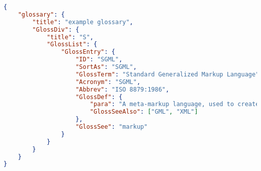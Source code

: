 \begin{frame}[containsverbatim]
	\begin{lstlisting}[language=json,firstnumber=1,basicstyle=\tiny]
{
    "glossary": {
        "title": "example glossary",
		"GlossDiv": {
            "title": "S",
			"GlossList": {
                "GlossEntry": {
                    "ID": "SGML",
					"SortAs": "SGML",
					"GlossTerm": "Standard Generalized Markup Language",
					"Acronym": "SGML",
					"Abbrev": "ISO 8879:1986",
					"GlossDef": {
                        "para": "A meta-markup language, used to create markup languages such as DocBook.",
						"GlossSeeAlso": ["GML", "XML"]
                    },
					"GlossSee": "markup"
                }
            }
        }
    }
}
	\end{lstlisting}		
	\end{frame}

